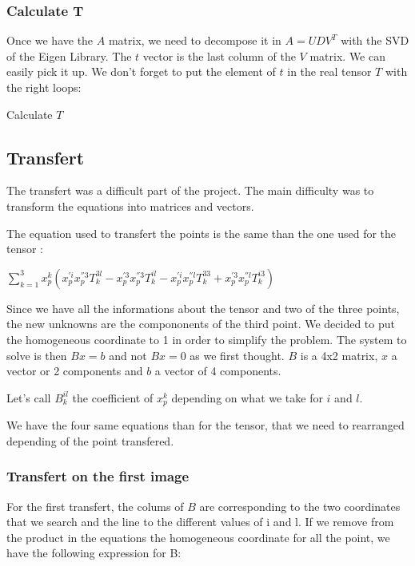 \documentclass{report}
\begin{document}
\subsubsection{Calculate T}
Once we have the $A$ matrix, we need to decompose it in $A=UDV^{T}$ with the SVD of the Eigen Library. The $t$ vector is the last column of the $V$ matrix. We can easily pick it up. 
We don't forget to put the element of $t$ in the real tensor $T$ with the right loops: 
\begin{algorithm}
\SetLine
\caption{Calculate $T$}
\SetLine
{}
\end{algorithm}



\textcolor{subtitle}{\subsection{Transfert}}
The transfert was a difficult part of the project. The main difficulty was to transform the equations into matrices and vectors.

The equation used to transfert the points is the same than the one used for the tensor : 
\begin{center}
 $ \displaystyle { \sum_{k = 1}^{3}} x_{p}^{k}(x_{p}^{'i}x_{p}^{''3}T_{k}^{3l} - x_{p}^{'3}x_{p}^{''3}T_{k}^{il} - x_{p}^{'i}x_{p}^{''l}T_{k}^{33} + x_{p}^{'3}x_{p}^{''l}T_{k}^{i3})$ 
\end{center}

Since we have all the informations about the tensor and two of the three points, the new unknowns are the compononents of the third point. We decided to put the homogeneous coordinate to 1 in order to simplify the problem. The system to solve is then $Bx=b$ and not $Bx=0$ as we first thought. $B$ is a 4x2 matrix, $x$ a vector or 2 components and $b$ a vector of 4 components. 

Let's call $B_{k}^{il}$ the coefficient of $x_{p}^{k}$ depending on what we take for $i$ and $l$. 

We have the four same equations than for the tensor, that we need to rearranged depending of the point transfered.


\subsubsection{Transfert on the first image}
For the first transfert, the colums of $B$ are corresponding to the two coordinates that we search and the line to the different values of i and l. If we remove from the product in the equations the homogeneous coordinate for all the point, we have the following expression for B:
\end{document}
